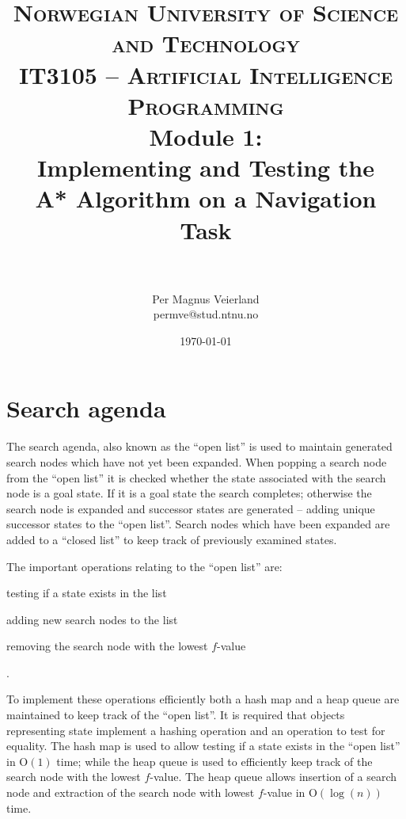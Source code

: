 

\title{
\normalfont \normalsize
\textsc{Norwegian University of Science and Technology\\IT3105 -- Artificial Intelligence Programming}
\horrule{0.5pt} \\[0.4cm]
\huge Module 1:\\Implementing and Testing the\\A* Algorithm on a Navigation Task\\
\horrule{2pt} \\[0.5cm]
}

\author{Per Magnus Veierland\\permve@stud.ntnu.no}

\date{\normalsize\today}



\maketitle

\newpage

\section*{Search agenda}

The search agenda, also known as the ``open list'' is used to maintain generated search nodes which have not yet been expanded. When popping a search node from the ``open list'' it is checked whether the state associated with the search node is a goal state. If it is a goal state the search completes; otherwise the search node is expanded and successor states are generated -- adding unique successor states to the ``open list''. Search nodes which have been expanded are added to a ``closed list'' to keep track of previously examined states.

The important operations relating to the ``open list'' are:
\begin{enumerate*}
\item testing if a state exists in the list
\item adding new search nodes to the list
\item removing the search node with the lowest $f$-value
\end{enumerate*}.

To implement these operations efficiently both a hash map and a heap queue are maintained to keep track of the ``open list''. It is required that objects representing state implement a hashing operation and an operation to test for equality. The hash map is used to allow testing if a state exists in the ``open list'' in O$(1)$ time; while the heap queue is used to efficiently keep track of the search node with the lowest $f$-value. The heap queue allows insertion of a search node and extraction of the search node with lowest $f$-value in O$(\log(n))$ time.

